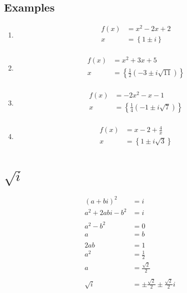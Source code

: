 \documentclass{exam}
\begin{document}
  \subsection{Examples}
  \begin{enumerate}
    \item 
      \begin{align*}
        f(x) &= x^2 - 2x + 2 \\
        x &= \left\{ 1 \pm i \right\} \\
      \end{align*}

    \item 
      \begin{align*}
        f(x) &= x^2 + 3 x + 5 \\
        x &= \left\{ \frac{1}{2} \left(-3 \pm i \sqrt{11}\right) \right\} \\
      \end{align*}

    \item 
      \begin{align*}
        f(x) &= -2 x^2 - x - 1 \\
        x &= \left\{ \frac{1}{4} \left(-1 \pm i \sqrt{7}\right) \right\} \\
      \end{align*}

    \item 
      \begin{align*}
        f(x) &= x - 2 + \frac{4}{x} \\
        x &= \left\{ 1 \pm i \sqrt{3} \right\} \\
      \end{align*}
  \end{enumerate}

  \section{$\sqrt{i}$}

  \begin{align*}
    (a + bi)^2       &= i \\
    a^2 + 2abi - b^2 &= i \\
    \\
    a^2 - b^2 &= 0 \\
    a         &= b \\
    \\
    2ab &= 1 \\
    a^2 &= \frac{1}{2} \\
    a   &= \frac{\sqrt{2}}{2} \\
    \\
    \sqrt{i} &= \pm \frac{\sqrt{2}}{2} \pm \frac{\sqrt{2}}{2} i \\
  \end{align*}
\end{document}
